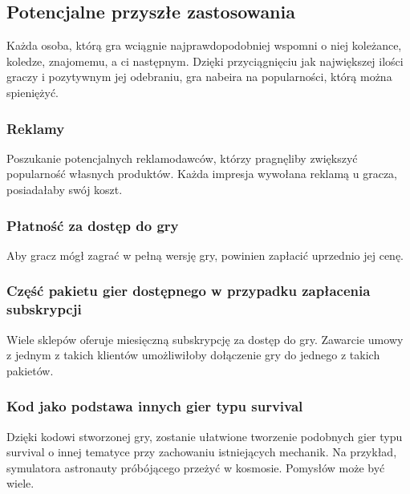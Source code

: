 \documentclass{article}
\begin{document}
\subsection{Potencjalne przyszłe zastosowania}
Każda osoba, którą gra wciągnie najprawdopodobniej wspomni o niej koleżance, koledze, znajomemu, a ci następnym. Dzięki przyciągnięciu jak największej ilości graczy i pozytywnym jej odebraniu, gra nabeira na popularności, którą można spieniężyć.
\subsubsection{Reklamy}
Poszukanie potencjalnych reklamodawców, którzy pragnęliby zwiększyć popularność własnych produktów. Każda impresja wywołana reklamą u gracza, posiadałaby swój koszt.
\subsubsection{Płatność za dostęp do gry}
Aby gracz mógł zagrać w pełną wersję gry, powinien zapłacić uprzednio jej cenę.
\subsubsection{Część pakietu gier dostępnego w przypadku zapłacenia subskrypcji}
Wiele sklepów oferuje miesięczną subskrypcję za dostęp do gry. Zawarcie umowy z jednym z takich klientów umożliwiłoby dołączenie gry do jednego z takich pakietów.
\subsubsection{Kod jako podstawa innych gier typu survival}
Dzięki kodowi stworzonej gry, zostanie ułatwione tworzenie podobnych gier typu survival o innej tematyce przy zachowaniu istniejących mechanik. Na przykład, symulatora astronauty próbójącego przeżyć w kosmosie. Pomysłów może być wiele.
\newpage
\end{document}
